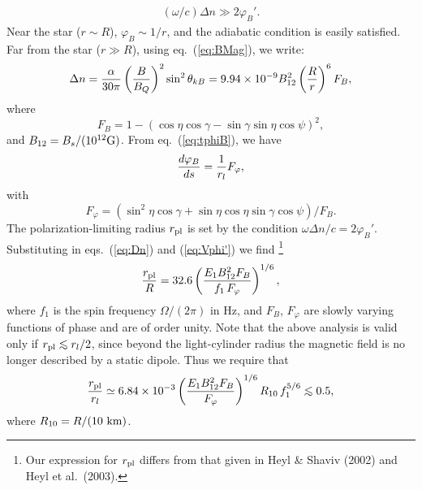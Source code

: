 \documentclass[useAMS,onecolumn,usenatbib,usegraphicx]{mn2e}
\def\be{\begin{equation}}
\def\ee{\end{equation}}
\def\lo{\mathrel{\raise.3ex\hbox{$<$}\mkern-14mu\lower0.6ex\hbox{$\sim$}}}
\begin{document}
\begin{eqnarray}
\label{eq:AdCond}
(\omega/c)\Delta n\gg 2\varphi_B'.
\end{eqnarray}
Near the star ($r\sim R$), $\varphi_B\sim 1/r$, and the adiabatic condition
is easily satisfied. Far from the star ($r\gg R$),
using eq.~(\ref{eq:BMag}), we write:
\be
\label{eq:Dn}
\Delta n = {\alpha\over 30\pi}\left({B\over B_Q}\right)^2
\sin^2\theta_{kB}
 = 9.94\times 10^{-9} B_{12}^2 \left({R\over r}\right)^6F_B,
\ee
where
\be
F_B = 1-\left(\cos\eta\cos\gamma-\sin\gamma\sin\eta\cos\psi\right)^2,
\ee
and $B_{12}=B_s/(10^{12}{\rm G})$. From eq.~(\ref{eq:tphiB}), we have
\be
\label{eq:Vphi'}
{d\varphi_B\over ds}  = {1\over r_l} F_{\varphi},
\ee
with
\be
F_{\varphi} = \left(\sin^2\eta\cos\gamma+\sin\eta\cos\eta\sin\gamma\cos\psi
\right)/F_B.
\ee
The polarization-limiting radius $r_{\rm pl}$ is set by 
the condition $\omega \Delta n/c = 2\varphi_B'$.
Substituting in eqs.~(\ref{eq:Dn}) and (\ref{eq:Vphi'}) we find
\footnote{Our expression for $r_{\rm pl}$ differs from that given in
Heyl \& Shaviv (2002) and Heyl et al.~(2003).}
\begin{eqnarray}
\label{eq:Rpl}
{r_{\rm pl}\over R}=32.6\left({E_1 B_{12}^2F_B\over
f_1\,F_{\varphi}}\right)^{1/6},
\end{eqnarray}
where $f_1$ is the spin frequency $\Omega/(2\pi)$ in Hz, 
and $F_B$, $F_{\varphi}$ are slowly varying functions of 
phase and are of order unity.  Note that the above analysis is valid
only if $r_{\rm pl}\lo r_l/2$, since beyond the light-cylinder radius
the magnetic field is no longer described by a static
dipole. Thus we require that
\be
{r_{\rm pl}\over r_l}\simeq 6.84\times 10^{-3}
\left({E_1 B_{12}^2F_B\over F_{\varphi}}\right)^{1/6}R_{10}\,f_1^{5/6}
\lo 0.5,
\label{eq:rplrl}\ee
where $R_{10}=R/(10~{\rm km})$.
\end{document}

